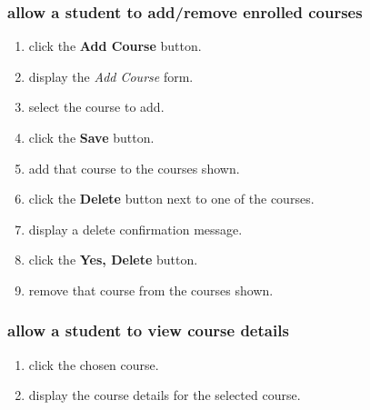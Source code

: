 \documentclass[12pt]{article}
\newenvironment{requirement}[1]
{
    \renewcommand{\thesubsubsection}{R\arabic{subsubsection}.}
    \renewcommand{\labelenumi}{
        \arabic{subsubsection}.\arabic{enumi}
    }
    \renewcommand{\labelenumii}{
        \arabic{subsubsection}.\arabic{enumi}.\arabic{enumii}
    }
    \renewcommand{\labelenumiii}{
        \arabic{subsubsection}.\arabic{enumi}.\arabic{enumii}.\arabic{enumiii}
    }
    \renewcommand{\labelenumiv}{
        \arabic{subsubsection}.\arabic{enumi}.\arabic{enumii}.\arabic{enumiii}.\arabic{enumiv}
    }
    \subsubsection{#1}
    \begin{enumerate}
}
{
    \end{enumerate}
}
\begin{document}
\begin{requirement}{\sysshall allow a student to add/remove enrolled courses}
    \navcourses
    \item \stushall click the \textbf{Add Course} button.
    \item \sysshall display the \emph{Add Course} form.
    \item \stushall select the course to add.
    \item \stushall click the \textbf{Save} button.
    \item \sysshall add that course to the courses shown.
    \item \stushall click the \textbf{Delete} button next to one of the courses.
    \item \sysshall display a delete confirmation message.
    \item \stushall click the \textbf{Yes, Delete} button.
    \item \sysshall remove that course from the courses shown.
    \gotohome
\end{requirement}

\newcommand{\navcoursedetails}{
    \navcourses
    \item \stushall click the chosen course.
    \item \sysshall display the course details for the selected course.
}

\begin{requirement}{\sysshall allow a student to view course details}
    \navcoursedetails
    \gotohome
\end{requirement}
\end{document}
